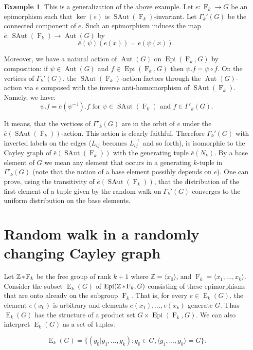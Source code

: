 \documentclass[12pt]{amsart}
\theoremstyle{definition}
\newtheorem{example}[theorem]{Example}
\numberwithin{figure}{section}
\numberwithin{table}{section}
\numberwithin{equation}{section}
\newcommand{\la}{\langle}
\newcommand{\ra}{\rangle}
\newcommand{\OP}[1]{\operatorname{#1}}
\newcommand{\Aut}{\operatorname{Aut}}
\newcommand{\SAut}{\operatorname{SAut}}
\newcommand{\Epi}{\operatorname{Epi}}
\newcommand{\F}{\operatorname{F}}
\newcommand{\myast}{\hspace{-1pt} \ast \hspace{-1pt}}
\newcommand{\BB}[1]{{\mathbb #1}}
\newcommand{\FP}{\mathbb{Z} \myast \F_k}
\begin{document}
\begin{example}\label{e:characteristic}
This is a generalization of the above example. Let $e \colon \F_k \to G$ be an epimorphism such that $\ker(e)$ is $\SAut(\F_k)$-invariant. Let $\Gamma_k'(G)$ be the connected component of $e$. Such an epimorphism induces the map $\bar{e} \colon \SAut(\F_k) \to \Aut(G)$ by 
$$\bar{e}(\psi)(e(x)) = e(\psi(x)).$$

Moreover, we have a natural action of $\Aut(G)$ on $\Epi(\F_k,G)$ by composition: if $\bar{\psi} \in \Aut(G)$ and $f \in \Epi(\F_k,G)$ then $\bar{\psi}.f = \bar{\psi} \circ f$. On the vertices of $\Gamma_k'(G)$, the $\SAut(\F_k)$-action factors through the $\Aut(G)$-action via $\bar{e}$ composed with the inverse anti-homomorphism of $\SAut(\F_k)$. Namely, we have:
$$\psi.f = \bar{e}(\psi^{-1}).f \text{ for } \psi \in \SAut(\F_k) \text{ and } f \in \Gamma'_k(G).$$ 

It means, that the vertices of $\Gamma'_k(G)$ are in the orbit of $e$ under the $\bar{e}(\SAut(\F_k))$-action. This action is clearly faithful. Therefore $\Gamma_k'(G)$ with inverted labels on the edges ($L_{ij}$ becomes $L^{-1}_{ij}$ and so forth), is isomorphic to the Cayley graph of $\bar{e}(\SAut(\F_k))$ with the generating tuple $\bar{e}(N_k)$. By a base element of $G$ we mean any element that occurs in a generating $k$-tuple in $\Gamma'_k(G)$ (note that the notion of a base element possibly depends on $e$). One can prove, using the transitivity of $\bar{e}(\SAut(\F_k))$, that the distribution of the first element of a tuple given by the random walk on $\Gamma_k'(G)$ converges to the uniform distribution on the base elements. 
\end{example}

\section{Random walk in a randomly changing Cayley graph}\label{s:random-walk}

Let $\FP$ be the free group of rank $k+1$ where $\BB Z = \la x_0 \ra$, and $\F_k = \la x_1,\ldots, x_k \ra$. Consider the subset $\OP E_k(G)$ of $\Epi(\FP,G)$ consisting of these epimorphisms that are onto already on the subgroup $\F_k$. That is, for every $e \in \OP E_k(G)$, the element $e(x_0)$ is arbitrary and elements $e(x_1), \ldots, e(x_k)$ generate $G$. Thus $\OP E_k(G)$ has the structure of a product set $G \times \Epi(\F_k,G)$. We can also interpret $\OP E_k(G)$ as a set of tuples:

$$
\OP E_k(G) = \{ (g_0 | g_1,\ldots,g_k) \colon g_0 \in G, \la g_1,\ldots,g_k \ra = G \}. 
$$
\end{document}
